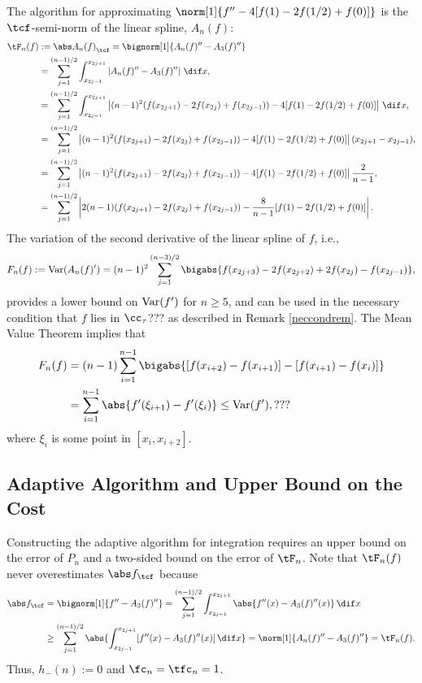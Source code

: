 The algorithm for approximating $\norm[1]{f''-4[f(1)-2f(1/2)+f(0)]}$ is the $\tcf$-semi-norm of the linear spline, $A_n(f)$:
\begin{align}
\nonumber
\tF_n(f)&:=\Ftnorm{A_n(f)}=\bignorm[1]{A_n(f)''-A_3(f)''} \\
\label{1direst}
&=\sum_{j=1}^{(n-1)/2}\int_{x_{2j-1}}^{x_{2j+1}}\left|A_n(f)''-A_3(f)''\right|\,\dif x, \\
&=\sum_{j=1}^{(n-1)/2}\int_{x_{2j-1}}^{x_{2j+1}}\left|(n-1)^2(f(x_{2j+1})-2f(x_{2j})+f(x_{2j-1})) - 4[f(1)-2f(1/2)+f(0)]\right|\,\dif x, \\
&=\sum_{j=1}^{(n-1)/2}\left|(n-1)^2(f(x_{2j+1})-2f(x_{2j})+f(x_{2j-1})) - 4[f(1)-2f(1/2)+f(0)]\right|(x_{2j+1}-x_{2j-1}), \\
&=\sum_{j=1}^{(n-1)/2}\left|(n-1)^2(f(x_{2j+1})-2f(x_{2j})+f(x_{2j-1})) - 4[f(1)-2f(1/2)+f(0)]\right|\frac{2}{n-1}, \\
&=\sum_{j=1}^{(n-1)/2}\left|2(n-1)(f(x_{2j+1})-2f(x_{2j})+f(x_{2j-1})) - \frac{8}{n-1}[f(1)-2f(1/2)+f(0)]\right|.
\end{align}
The variation of the second derivative of the linear spline of $f$, i.e.,
\begin{equation} \label{Fnormalg}
F_n(f) :=\Var(A_n(f)') = (n-1)^2\sum_{j=1}^{(n-3)/2} \bigabs{f(x_{2j+3}) - 2 f(x_{2j+2})+2f(x_{2j})-f(x_{2j-1})},
\end{equation}
provides a lower bound on $\operatorname{Var}(f')$ for $n \ge 5$, and can be used in the necessary condition that $f$ lies in $\cc_\tau$??? as described in Remark \ref{neccondrem}.
The Mean Value Theorem implies that
\begin{align*}
F_n(f) &= (n-1)\sum_{i=1}^{n-1} \bigabs{[f(x_{i+2}) - f(x_{i+1})] - [f(x_{i+1}) - f(x_{i})]} \\
&= \sum_{i=1}^{n-1} \abs{f'(\xi_{i+1}) - f'(\xi_{i})} \le \Var(f'),???
\end{align*}
where $\xi_i$ is some point in $[x_i,x_{i+2}]$.


\subsection{Adaptive Algorithm and Upper Bound on the Cost}

Constructing the adaptive algorithm for integration requires an upper bound on the error of $P_n$ and a two-sided bound on the error of $\tF_n$.  Note that $\tF_{n}(f)$ never overestimates $\Ftnorm{f}$ because
\begin{align*}
\Ftnorm{f} & = \bignorm[1]{f''-A_3(f)''}
= \sum_{j=1}^{(n-1)/2} \int_{x_{2j-1}}^{x_{2j+1}} \abs{f''(x) - A_3(f)''(x)} \, \dif x \\
& \ge \sum_{j=1}^{(n-1)/2} \abs{\int_{x_{2j-1}}^{x_{2j+1}} [f''(x) - A_3(f)''(x)] \, \dif x}=\norm[1]{A_n(f)''-A_3(f)''} = \tF_n(f).
\end{align*}
Thus, $h_{-}(n):=0$ and $\fc_n=\tfc_n=1$.

